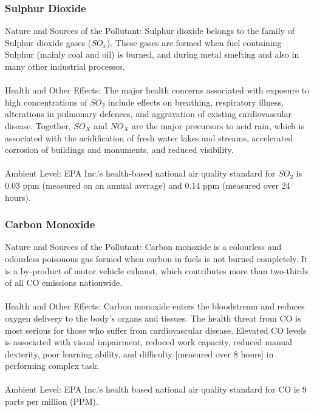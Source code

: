 \subsubsection{Sulphur Dioxide}
Nature and Sources of the Pollutant: Sulphur dioxide belongs to the family of Sulphur dioxide gases ($SO_x$). These gases are formed when fuel containing Sulphur (mainly coal and oil) is burned, and during metal smelting and also in many other industrial processes.
\\
\\
Health and Other Effects: The major health concerns associated with exposure to high concentrations of $SO_2$ include effects on breathing, respiratory illness, alterations in pulmonary defences, and aggravation of existing cardiovascular disease. Together, $SO_X$ and $NO_X$ are the major precursors to acid rain, which is associated with the acidification of fresh water lakes and streams, accelerated corrosion of buildings and monuments, and reduced visibility. 
\\
\\
Ambient Level: EPA Inc.'s health-based national air quality standard for $SO_2$ is 0.03 ppm (measured on an annual average) and 0.14 ppm (measured over 24 hours).

\subsubsection{Carbon Monoxide}
Nature and Sources of the Pollutant: Carbon monoxide is a colourless and odourless poisonous gas formed when carbon in fuels is not burned completely. It is a by-product of motor vehicle exhaust, which contributes more than two-thirds of all CO emissions nationwide.
\\
\\
Health and Other Effects: Carbon monoxide enters the bloodstream and reduces oxygen delivery to the body's organs and tissues. The health threat from CO is most serious for those who suffer from cardiovascular disease. Elevated CO levels is associated with visual impairment, reduced work capacity, reduced manual dexterity, poor learning ability, and difficulty [measured over 8 hours] in performing complex task.
\\
\\
Ambient Level: EPA Inc.'s health based national air quality standard for CO is 9 parts per million (PPM).

